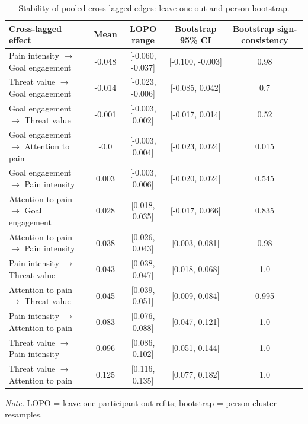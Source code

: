 \begin{table}[!htbp]
\raggedright
\caption{Stability of pooled cross-lagged edges: leave-one-out and person bootstrap.}
\label{tab:robust}
\footnotesize
\begingroup
\setlength{\tabcolsep}{4pt}
\renewcommand{\arraystretch}{1.08}
\noindent
\begin{tabular*}{\textwidth}{@{\extracolsep{\fill}}lcccc@{}}
\toprule
Cross-lagged effect & Mean & LOPO range & Bootstrap 95\% CI & Bootstrap sign-consistency \\
\midrule
Pain intensity $\rightarrow$ Goal engagement & -0.048 & [-0.060, -0.037] & [-0.100, -0.003] & 0.98 \\
Threat value $\rightarrow$ Goal engagement & -0.014 & [-0.023, -0.006] & [-0.085, 0.042] & 0.7 \\
Goal engagement $\rightarrow$ Threat value & -0.001 & [-0.003, 0.002] & [-0.017, 0.014] & 0.52 \\
Goal engagement $\rightarrow$ Attention to pain & -0.0 & [-0.003, 0.004] & [-0.023, 0.024] & 0.015 \\
Goal engagement $\rightarrow$ Pain intensity & 0.003 & [-0.003, 0.006] & [-0.020, 0.024] & 0.545 \\
Attention to pain $\rightarrow$ Goal engagement & 0.028 & [0.018, 0.035] & [-0.017, 0.066] & 0.835 \\
Attention to pain $\rightarrow$ Pain intensity & 0.038 & [0.026, 0.043] & [0.003, 0.081] & 0.98 \\
Pain intensity $\rightarrow$ Threat value & 0.043 & [0.038, 0.047] & [0.018, 0.068] & 1.0 \\
Attention to pain $\rightarrow$ Threat value & 0.045 & [0.039, 0.051] & [0.009, 0.084] & 0.995 \\
Pain intensity $\rightarrow$ Attention to pain & 0.083 & [0.076, 0.088] & [0.047, 0.121] & 1.0 \\
Threat value $\rightarrow$ Pain intensity & 0.096 & [0.086, 0.102] & [0.051, 0.144] & 1.0 \\
Threat value $\rightarrow$ Attention to pain & 0.125 & [0.116, 0.135] & [0.077, 0.182] & 1.0 \\
\bottomrule
\end{tabular*}
\par\vspace{3pt}\noindent\parbox{\textwidth}{\footnotesize\textit{Note.} LOPO = leave-one-participant-out refits; bootstrap = person cluster resamples.}
\endgroup
\end{table}
